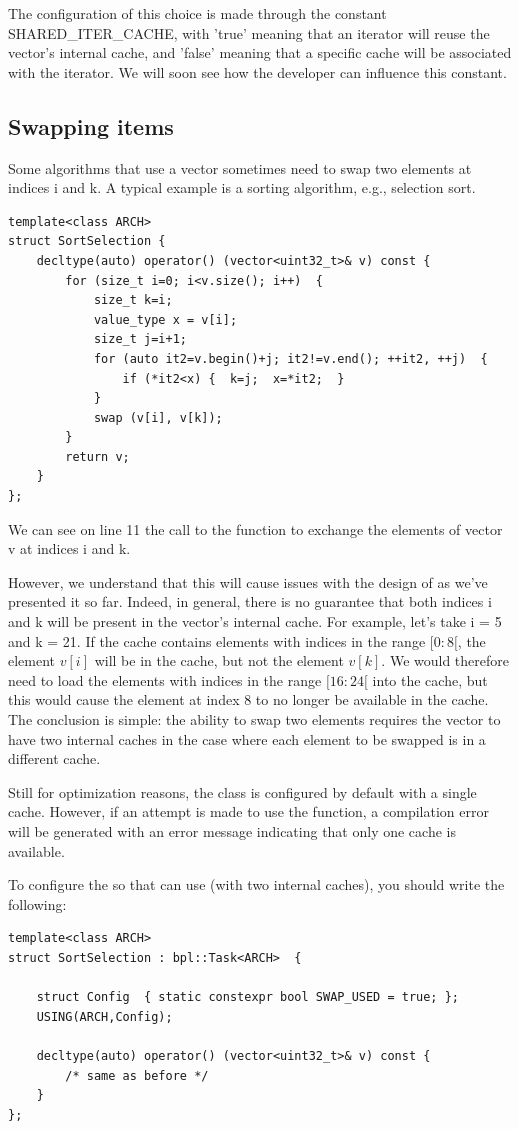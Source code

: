  The configuration of this choice is made through the constant SHARED\_ITER\_CACHE, with 'true' meaning that an 
 iterator will reuse the vector's internal cache, and 'false' meaning that a specific cache will be associated with the iterator.
 We will soon see how the developer can influence this constant.
  
 \subsection{Swapping items}
Some algorithms that use a vector sometimes need to swap two elements at indices i and k. A typical example is a sorting algorithm, 
e.g., selection sort.
\begin{verbatim}
template<class ARCH>
struct SortSelection {
    decltype(auto) operator() (vector<uint32_t>& v) const {
        for (size_t i=0; i<v.size(); i++)  {
            size_t k=i;
            value_type x = v[i];
            size_t j=i+1;
            for (auto it2=v.begin()+j; it2!=v.end(); ++it2, ++j)  {
                if (*it2<x) {  k=j;  x=*it2;  } 
            }
            swap (v[i], v[k]);
        }
        return v;
    }
};
\end{verbatim}
We can see on line 11 the call to the  function to exchange the elements of vector v at indices i and k.

However, we understand that this will cause issues with the design of  as we've presented it so far. 
Indeed, in general, there is no guarantee that both indices i and k will be present in the vector's internal cache. 
For example, let's take i = 5 and k = 21. If the cache contains elements with indices in the range $[0:8[$, 
the element $v[i]$ will be in the cache, but not the element $v[k]$. We would therefore need to load the elements with 
indices in the range $[16:24[$ into the cache, but this would cause the element at index $8$ to no longer be 
available in the cache. The conclusion is simple: the ability to swap two elements requires the vector to have 
two internal caches in the case where each element to be swapped is in a different cache.

Still for optimization reasons, the  class is configured by default with a single cache. 
However, if an attempt is made to use the  function, a compilation error will be generated
 with an error message indicating that only one cache is available.  

To configure the \BPL so that  can use  (with two internal caches), 
you should write the following:
\begin{verbatim}
template<class ARCH>
struct SortSelection : bpl::Task<ARCH>  {
	
    struct Config  { static constexpr bool SWAP_USED = true; };
    USING(ARCH,Config);

    decltype(auto) operator() (vector<uint32_t>& v) const { 
        /* same as before */
    }
};
\end{verbatim}


